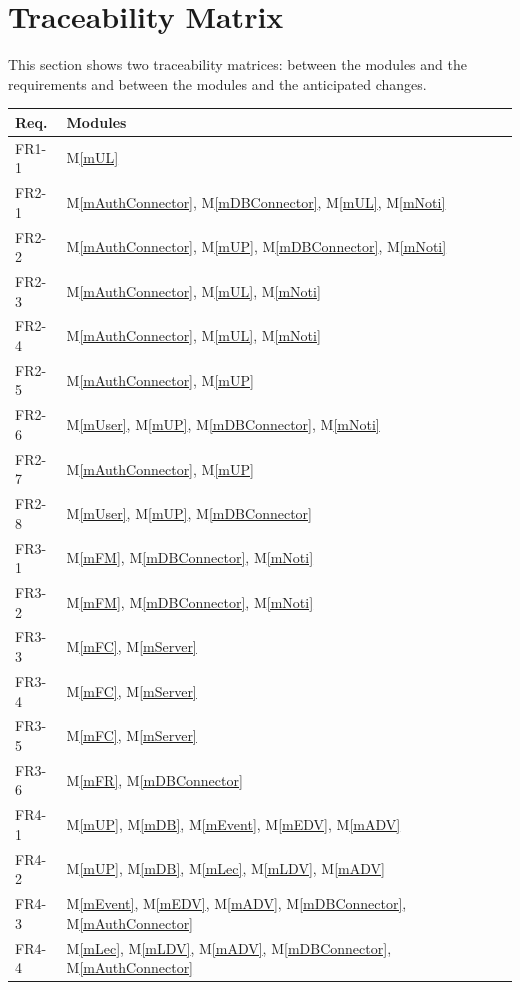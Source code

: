 \documentclass[12pt, titlepage]{article}
\newcommand{\mref}[1]{M\ref{#1}}
\begin{document}
\section{Traceability Matrix} \label{SecTM}

This section shows two traceability matrices: between the modules and the
requirements and between the modules and the anticipated changes.

\begin{table}[H]
\centering
\begin{tabular}{p{} p{}}
\toprule
\textbf{Req.} & \textbf{Modules}\\
\midrule
FR1-1 & \mref{mUL}\\
FR2-1 & \mref{mAuthConnector}, \mref{mDBConnector}, \mref{mUL}, \mref{mNoti}\\
FR2-2 & \mref{mAuthConnector}, \mref{mUP}, \mref{mDBConnector}, \mref{mNoti}\\
FR2-3 & \mref{mAuthConnector}, \mref{mUL}, \mref{mNoti}\\
FR2-4 & \mref{mAuthConnector}, \mref{mUL}, \mref{mNoti}\\
FR2-5 & \mref{mAuthConnector}, \mref{mUP}\\
FR2-6 & \mref{mUser}, \mref{mUP}, \mref{mDBConnector}, \mref{mNoti}\\
FR2-7 & \mref{mAuthConnector}, \mref{mUP}\\
FR2-8 & \mref{mUser}, \mref{mUP}, \mref{mDBConnector}\\
FR3-1 & \mref{mFM}, \mref{mDBConnector}, \mref{mNoti}\\
FR3-2 & \mref{mFM}, \mref{mDBConnector}, \mref{mNoti}\\
FR3-3 & \mref{mFC}, \mref{mServer}\\
FR3-4 & \mref{mFC}, \mref{mServer}\\
FR3-5 & \mref{mFC}, \mref{mServer}\\
FR3-6 & \mref{mFR}, \mref{mDBConnector}\\
FR4-1 & \mref{mUP}, \mref{mDB}, \mref{mEvent}, \mref{mEDV}, \mref{mADV}\\
FR4-2 & \mref{mUP}, \mref{mDB}, \mref{mLec}, \mref{mLDV}, \mref{mADV}\\
FR4-3 & \mref{mEvent}, \mref{mEDV}, \mref{mADV}, \mref{mDBConnector}, \mref{mAuthConnector}\\
FR4-4 & \mref{mLec}, \mref{mLDV}, \mref{mADV}, \mref{mDBConnector}, \mref{mAuthConnector}\\

\end{tabular}
\end{table}
\end{document}
